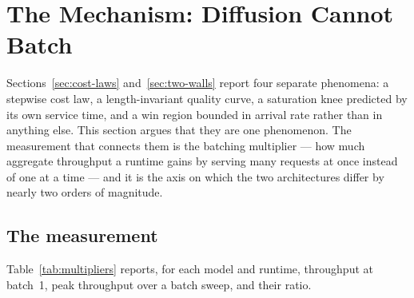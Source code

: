 \section{The Mechanism: Diffusion Cannot Batch}
\label{sec:mechanism}

Sections~\ref{sec:cost-laws} and~\ref{sec:two-walls} report four separate
phenomena: a stepwise cost law, a length-invariant quality curve, a saturation
knee predicted by its own service time, and a win region bounded in arrival rate
rather than in anything else. This section argues that they are one phenomenon.
The measurement that connects them is the batching multiplier --- how much
aggregate throughput a runtime gains by serving many requests at once instead of
one at a time --- and it is the axis on which the two architectures differ by
nearly two orders of magnitude.

\subsection{The measurement}
\label{sec:mechanism:measurement}

Table~\ref{tab:multipliers} reports, for each model and runtime, throughput at
batch~1, peak throughput over a batch sweep, and their ratio.

